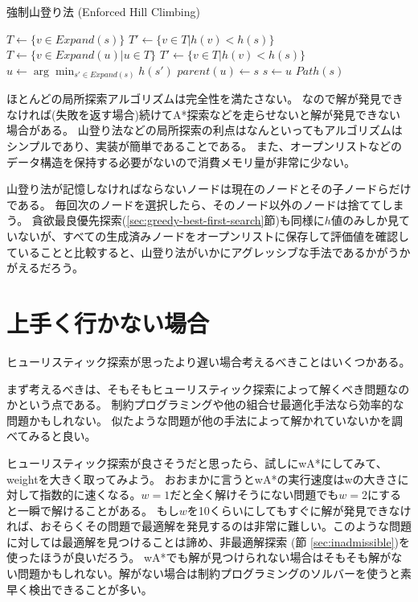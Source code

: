 \begin{algorithm}
\caption{強制山登り法 (Enforced Hill Climbing)}
	 {
	  $T \leftarrow \{v \in Expand(s)\}$\;
	  $T' \leftarrow \{v \in T | h(v) < h(s) \}$\;
           {
            $T \leftarrow \{v \in Expand(u) | u \in T\}$\;
 	    $T' \leftarrow \{v \in T | h(v) < h(s) \}$\;
          }
	  $u \leftarrow \arg \min_{s' \in Expand(s)} h(s')$\;
          $parent(u) \leftarrow s$\;
          $s \leftarrow u$\;
	}
	\Return $Path(s)$
\label{alg:hill-climbing}
\end{algorithm}


ほとんどの局所探索アルゴリズムは完全性を満たさない。
なので解が発見できなければ(失敗を返す場合)続けてA*探索などを走らせないと解が発見できない場合がある。
山登り法などの局所探索の利点はなんといってもアルゴリズムはシンプルであり、実装が簡単であることである。
また、オープンリストなどのデータ構造を保持する必要がないので消費メモリ量が非常に少ない。

山登り法が記憶しなければならないノードは現在のノードとその子ノードらだけである。
毎回次のノードを選択したら、そのノード以外のノードは捨ててしまう。
貪欲最良優先探索(\ref{sec:greedy-best-first-search}節)も同様に$h$値のみしか見ていないが、すべての生成済みノードをオープンリストに保存して評価値を確認していることと比較すると、山登り法がいかにアグレッシブな手法であるかがうかがえるだろう。

\section{上手く行かない場合}

ヒューリスティック探索が思ったより遅い場合考えるべきことはいくつかある。

まず考えるべきは、そもそもヒューリスティック探索によって解くべき問題なのかという点である。
制約プログラミングや他の組合せ最適化手法なら効率的な問題かもしれない。
似たような問題が他の手法によって解かれていないかを調べてみると良い。

ヒューリスティック探索が良さそうだと思ったら、試しにwA*にしてみて、weightを大きく取ってみよう。
おおまかに言うとwA*の実行速度はwの大きさに対して指数的に速くなる。$w=1$だと全く解けそうにない問題でも$w=2$にすると一瞬で解けることがある。
もし$w$を10くらいにしてもすぐに解が発見できなければ、おそらくその問題で最適解を発見するのは非常に難しい。このような問題に対しては最適解を見つけることは諦め、非最適解探索 (節 \ref{sec:inadmissible})を使ったほうが良いだろう。
wA*でも解が見つけられない場合はそもそも解がない問題かもしれない。解がない場合は制約プログラミングのソルバーを使うと素早く検出できることが多い。

